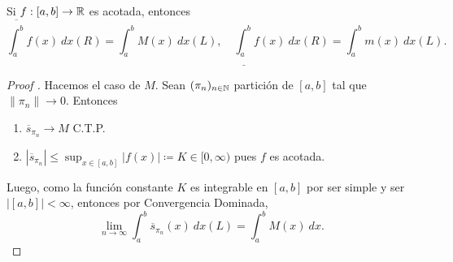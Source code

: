 \begin{prop}
	Si $f : [a,b] \to \mathbb{R}$ es acotada, entonces
	\[ \overline{\int_{a}^{b}} f(x) \ dx(R) = \int_{a}^{b} M(x) \ dx(L), \quad \underline{\int_{a}^{b}} f(x) \ dx (R) = \int_{a}^{b} m(x) \ dx (L). \]
\end{prop}
\begin{proof}[Proof ]
	Hacemos el caso de $M$. Sean $(\pi_{n})_{n\in\mathbb{N}}$ partición de $[a,b]$ tal que $\| \pi_{n} \| \longrightarrow 0$. Entonces
	\begin{enumerate}
		\item $\overline{s}_{\pi_{n}} \longrightarrow M$ C.T.P.

		\item $| \overline{s}_{\pi_{n}} | \leq \sup_{x \in [a,b]} |f(x)| \coloneq K \in [0,\infty)$ pues $f$ es acotada.
	\end{enumerate}
	Luego, como la función constante $K$ es integrable en $[a,b]$ por ser simple y ser $|[a,b]| < \infty$, entonces por Convergencia Dominada,
	\[ \lim_{n \to \infty} \int_{a}^{b} \overline{s}_{\pi_{n}}(x) \ dx (L) = \int_{a}^{b} M(x) \ dx. \]
\end{proof}
